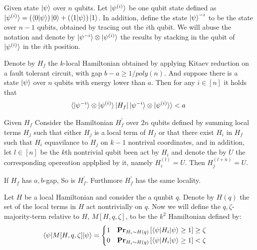 \documentclass[manuscript,screen,review]{acmart}
\begin{document}
\newpage

\begin{definition}
  Given state $\ket{\psi}$ over $n$ qubits. Let $\ket{\psi^{(i)}}$ be one qubit state defined as $\ket{\psi^{(i)}} = \left( \braket{0|\psi} \right)  \ket{0} + \left( \braket{1|\psi} \right)  \ket{1}$. In addition, define the state $\ket{\psi}^{-i}$ to be the state over $n-1$ qubits, obtained by tracing out the $i$th qubit. We will abuse the notation and denote by $\ket{\psi^{-i}} \otimes \ket{\psi^{(i)}}$ the results by stacking in the qubit of $\ket{\psi^{(i)}}$ in the $i$th position. 
\end{definition}

\begin{claim} \label{claim:noisyproof}
  Denote by $H_{f}$ the $k$-local Hamiltonian obtained by applying Kitaev reduction on a fault tolerant circuit, with gap $b -a \ge 1/poly(n)$. And suppose there is a state $\ket{\psi}$ over $n$ qubits with energy lower than $a$. Then for any $i \in [n]$ it holds that 
  \begin{equation*}
    \begin{split}    
  \braket{\ket{\psi^{-i}} \otimes \ket{\psi^{(i)}}|H_{f}|\ket{\psi^{-i}} \otimes \ket{\psi^{(i)}}} < a
    \end{split}
  \end{equation*}
\end{claim}

\begin{definition} \label{definition:denseHam}
  Given $H_{f}$ Consider the Hamiltonian $H^{\prime}_{f}$ over $2n$ qubits defined by summing local terms $H_{j}$ such that either $H_{j}$ is a local term of $H_{f}$ or that there exist $H_{i}$ in $H_{f}$ such that $H_{i}$ equavilance to $H_{j}$ on $k-1$ nontrival coordinates, and in addition, let $l\in [n]$ be the $k$th nontrivial qubit been act by $H_{i}$ and denote the by $U$ the corresponding opereation applplied by it, namely $H_{i}^{(l)} = U$. Then $H_{j}^{(l + n)} = U$. 
\end{definition}

\begin{claim}
  If $H_{f}$ has $a,b$-gap, So is $H^{\prime}_{f}$. Furthmore $H^{\prime}_{f}$ has the same locality. 
\end{claim}
\begin{definition}
  Let $H$ be a local Hamiltonian and consider the a qunbit $q$. Denote by $H(q)$ the set of the local terms in $H$ act nontrivially on $q$. Now we will define the $q,\zeta$-majority-term relative to $H$, $M[H,q,\zeta]$, to be the $k^{2}$ Hamiltonian defined by: 
  \begin{equation*}
    \braket{\psi|M[H,q,\zeta]|\psi} = \begin{cases}
      \begin{split}
        & 1 & \prbm{ \braket{\psi|H_{i}|\psi} \ge 1 }{H_{i} \sim H(q)} \ge \zeta \\
        & 0 & \prbm{ \braket{\psi|H_{i}|\psi} \ge 1 }{H_{i} \sim H(q)} < \zeta 
    \end{split}
  \end{cases}
  \end{equation*}
\end{definition}
\end{document}
